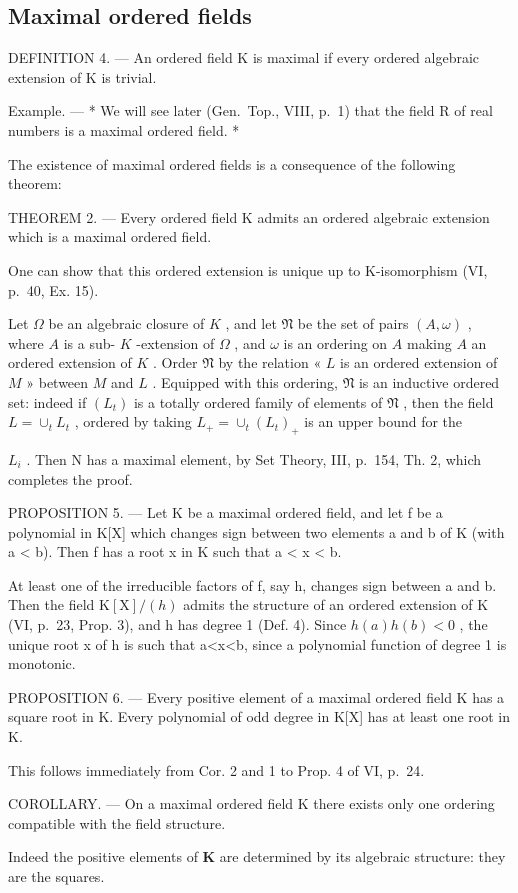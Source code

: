 \subsection{Maximal ordered fields}

DEFINITION 4. --- An ordered field K is maximal if every ordered algebraic extension of K is trivial.

Example. --- * We will see later (Gen.~Top., VIII, p.~1) that the field R of real numbers is a maximal ordered field. *

The existence of maximal ordered fields is a consequence of the following theorem:

THEOREM 2. --- Every ordered field K admits an ordered algebraic extension which is a maximal ordered field.

One can show that this ordered extension is unique up to K-isomorphism (VI, p.~40, Ex. 15).

Let \(\Omega\) be an algebraic closure of \(K\) , and let \(\mathfrak{N}\) be the set of pairs \((A, \omega)\) , where \(A\) is a sub- \(K\) -extension of \(\Omega\) , and \(\omega\) is an ordering on \(A\) making \(A\) an ordered extension of \(K\) . Order \(\mathfrak{N}\) by the relation « \(L\) is an ordered extension of \(M\) » between \(M\) and \(L\) . Equipped with this ordering, \(\mathfrak{N}\) is an inductive ordered set: indeed if \((L_{t})\) is a totally ordered family of elements of \(\mathfrak{N}\) , then the field \(L = \cup_{t} L_{t}\) , ordered by taking \(L_{+} = \cup_{t} (L_{t})_{+}\) is an upper bound for the

\(L_{i}\) . Then N has a maximal element, by Set Theory, III, p.~154, Th. 2, which completes the proof.

PROPOSITION 5. --- Let K be a maximal ordered field, and let f be a polynomial in K{[}X{]} which changes sign between two elements a and b of K (with a \textless{} b). Then f has a root x in K such that a \textless{} x \textless{} b.

At least one of the irreducible factors of f, say h, changes sign between a and b. Then the field \(\mathrm{K}[\mathrm{X}]/(h)\) admits the structure of an ordered extension of K (VI, p.~23, Prop. 3), and h has degree 1 (Def. 4). Since \(h(a)h(b)<0\) , the unique root x of h is such that a\textless x\textless b, since a polynomial function of degree 1 is monotonic.

PROPOSITION 6. --- Every positive element of a maximal ordered field K has a square root in K. Every polynomial of odd degree in K{[}X{]} has at least one root in K.

This follows immediately from Cor. 2 and 1 to Prop. 4 of VI, p.~24.

COROLLARY. --- On a maximal ordered field K there exists only one ordering compatible with the field structure.

Indeed the positive elements of \(\mathbf{K}\) are determined by its algebraic structure: they are the squares.

